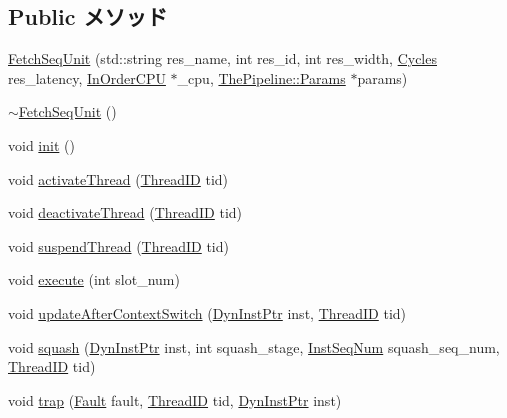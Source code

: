 \subsection*{Public メソッド}
\begin{DoxyCompactItemize}
\item 
\hyperlink{classFetchSeqUnit_ae6f057ce72f6f86ce462fbca75d64a67}{FetchSeqUnit} (std::string res\_\-name, int res\_\-id, int res\_\-width, \hyperlink{classCycles}{Cycles} res\_\-latency, \hyperlink{classInOrderCPU}{InOrderCPU} $\ast$\_\-cpu, \hyperlink{namespaceThePipeline_ab62ca16eeca26566ad2422b5df4943ce}{ThePipeline::Params} $\ast$params)
\item 
\hyperlink{classFetchSeqUnit_ab25f7626363f6e2ac1e2e1b838d9f74a}{$\sim$FetchSeqUnit} ()
\item 
void \hyperlink{classFetchSeqUnit_a02fd73d861ef2e4aabb38c0c9ff82947}{init} ()
\item 
void \hyperlink{classFetchSeqUnit_a687aa4600423bb30ecf3bb1da6cd6000}{activateThread} (\hyperlink{base_2types_8hh_ab39b1a4f9dad884694c7a74ed69e6a6b}{ThreadID} tid)
\item 
void \hyperlink{classFetchSeqUnit_ad11d9216ad92d9036ebf37844cf6e706}{deactivateThread} (\hyperlink{base_2types_8hh_ab39b1a4f9dad884694c7a74ed69e6a6b}{ThreadID} tid)
\item 
void \hyperlink{classFetchSeqUnit_aee7a498a20266fbfbc6aa3f165577b68}{suspendThread} (\hyperlink{base_2types_8hh_ab39b1a4f9dad884694c7a74ed69e6a6b}{ThreadID} tid)
\item 
void \hyperlink{classFetchSeqUnit_a7b7fff82f8c9cbdb02add1346f60bb9e}{execute} (int slot\_\-num)
\item 
void \hyperlink{classFetchSeqUnit_a339073618ad3c21c492d64a55ce2e216}{updateAfterContextSwitch} (\hyperlink{classRefCountingPtr}{DynInstPtr} inst, \hyperlink{base_2types_8hh_ab39b1a4f9dad884694c7a74ed69e6a6b}{ThreadID} tid)
\item 
void \hyperlink{classFetchSeqUnit_a48e371fe43e53aebbe5b2b2afc5aa8e3}{squash} (\hyperlink{classRefCountingPtr}{DynInstPtr} inst, int squash\_\-stage, \hyperlink{inst__seq_8hh_a258d93d98edaedee089435c19ea2ea2e}{InstSeqNum} squash\_\-seq\_\-num, \hyperlink{base_2types_8hh_ab39b1a4f9dad884694c7a74ed69e6a6b}{ThreadID} tid)
\item 
void \hyperlink{classFetchSeqUnit_abf76d6d245f7d3b17d26ea8dcc0cf36f}{trap} (\hyperlink{classRefCountingPtr}{Fault} fault, \hyperlink{base_2types_8hh_ab39b1a4f9dad884694c7a74ed69e6a6b}{ThreadID} tid, \hyperlink{classRefCountingPtr}{DynInstPtr} inst)
\end{DoxyCompactItemize}
